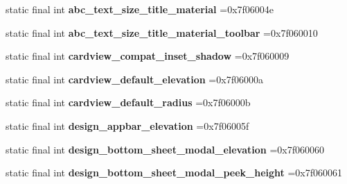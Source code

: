 \begin{DoxyCompactItemize}
\mbox{\label{classproject4_1_1xaria_1_1R_1_1dimen_ac7d4ff41619f07e459668bffbf2bbd47}} 
static final int {\bfseries abc\+\_\+text\+\_\+size\+\_\+title\+\_\+material} =0x7f06004e
\item 
\mbox{\label{classproject4_1_1xaria_1_1R_1_1dimen_a85bb0058c0611e0f53f5dc2f51af3418}} 
static final int {\bfseries abc\+\_\+text\+\_\+size\+\_\+title\+\_\+material\+\_\+toolbar} =0x7f060010
\item 
\mbox{\label{classproject4_1_1xaria_1_1R_1_1dimen_a77b2634a4c8355017cbb173bc6750833}} 
static final int {\bfseries cardview\+\_\+compat\+\_\+inset\+\_\+shadow} =0x7f060009
\item 
\mbox{\label{classproject4_1_1xaria_1_1R_1_1dimen_a94a4d2cf4a03fac83ab3eb450819f2ee}} 
static final int {\bfseries cardview\+\_\+default\+\_\+elevation} =0x7f06000a
\item 
\mbox{\label{classproject4_1_1xaria_1_1R_1_1dimen_a95f3a3b02ff6b1856d423ca0d73e0d35}} 
static final int {\bfseries cardview\+\_\+default\+\_\+radius} =0x7f06000b
\item 
\mbox{\label{classproject4_1_1xaria_1_1R_1_1dimen_aa060fdc0653e58b620ccd7eb8f0138e5}} 
static final int {\bfseries design\+\_\+appbar\+\_\+elevation} =0x7f06005f
\item 
\mbox{\label{classproject4_1_1xaria_1_1R_1_1dimen_a963a68f24fcc32bc808e36155022387a}} 
static final int {\bfseries design\+\_\+bottom\+\_\+sheet\+\_\+modal\+\_\+elevation} =0x7f060060
\item 
\mbox{\label{classproject4_1_1xaria_1_1R_1_1dimen_a3070ad5aa89273840679b829406e900e}} 
static final int {\bfseries design\+\_\+bottom\+\_\+sheet\+\_\+modal\+\_\+peek\+\_\+height} =0x7f060061
\item 
\mbox{\label{classproject4_1_1xaria_1_1R_1_1dimen_a36bf3c5bc6125a11f3839f96908c30c7}} 

\end{DoxyCompactItemize}
